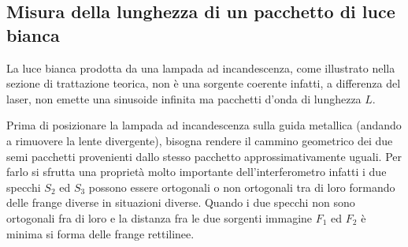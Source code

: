 \documentclass[11pt]{article}
\begin{document}
\subsection{Misura della lunghezza di un pacchetto di luce bianca}
La luce bianca prodotta da una lampada ad incandescenza, come illustrato nella sezione di trattazione teorica, non è una sorgente coerente infatti, a differenza del laser, non emette una sinusoide infinita ma pacchetti d'onda di lunghezza $L$. 

Prima di posizionare la lampada ad incandescenza sulla guida metallica (andando a rimuovere la lente divergente), bisogna rendere il cammino geometrico dei due semi pacchetti provenienti dallo stesso pacchetto approssimativamente uguali. Per farlo si sfrutta una proprietà molto importante dell'interferometro infatti i due specchi $S_2$ ed $S_3$ possono essere ortogonali o non ortogonali tra di loro formando delle frange diverse in situazioni diverse. Quando i due specchi non sono ortogonali fra di loro e la distanza fra le due sorgenti immagine $F_1$ ed $F_2$ è minima si forma delle frange rettilinee.
\end{document}
